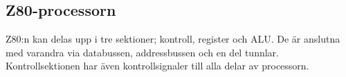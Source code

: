 \documentclass[main.tex]{subfiles}
\begin{document}
\subsection{Z80-processorn}
Z80:n kan delas upp i tre sektioner; kontroll, register och ALU. De är anslutna
med varandra via databussen, addressbussen och en del tunnlar.
Kontrollsektionen har även kontrollsignaler till alla delar av processorn.




\end{document}
